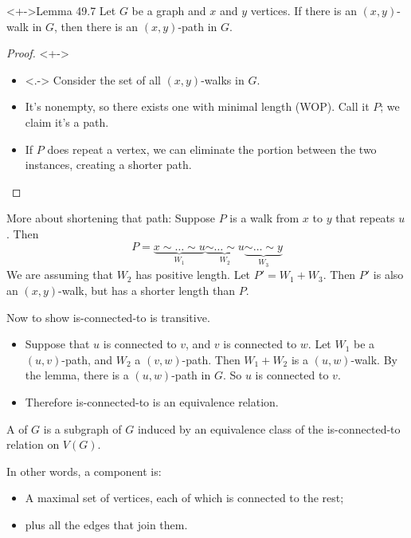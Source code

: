 \documentclass
[ignorenonframetext,14pt,aspectratio=169]
{ngelessonslides}
\begin{document}
\begin{frame}[label=lemma]
\begin{block}<+->{Lemma 49.7}
Let $G$ be a graph and $x$ and $y$ vertices.
If there is an $(x,y)$-walk in $G$, then there is an $(x,y)$-path in $G$.
\end{block}
\begin{proof}<+->
\begin{itemize}
\item<.-> Consider the set of all $(x,y)$-walks in $G$.
\item<+-> It's nonempty, so there exists one with minimal length (WOP).  Call it $P$; we claim it's a path.
\item<+-> If $P$ does repeat a vertex, we can eliminate the portion between the two instances, creating a shorter path. \raa \qedhere
\end{itemize}
\end{proof}
\end{frame}

\begin{frame}[label=lemma-2]
More about shortening that path:  Suppose $P$ is a walk from $x$ to $y$ that repeats $u$.  Then
\[
    P = \underbrace{x \sim \dots \sim u}_{W_1}%
    \underbrace{\sim \dots \sim u}_{W_2}%
    \underbrace{\sim \dots \sim y}_{W_3}
\]
We are assuming that $W_2$ has positive length.
Let $P' = W_1 + W_3$.  Then $P'$ is also an $(x,y)$-walk, but has a shorter length than $P$.
\end{frame}

\begin{frame}[label=ctd-thm-proof-2]
Now to show is-connected-to is transitive.
\begin{itemize}
\item Suppose that $u$ is connected to $v$, and $v$ is connected to $w$.
    Let $W_1$ be a $(u,v)$-path, and $W_2$ a $(v,w)$-path.
    Then $W_1+W_2$ is a $(u,w)$-walk.
    By the lemma, there is a $(u,w)$-path in $G$.
    So $u$ is connected to $v$.
\item Therefore is-connected-to is an equivalence relation.
\end{itemize}
\end{frame}

\begin{frame}[label=cpt-def]
\begin{definition}
    A  of $G$ is a subgraph of $G$ induced by an equivalence class of
    the is-connected-to relation on $V(G)$.
\end{definition}
In other words, a component is:
\begin{itemize}
\item A maximal set of vertices, each of which is connected to the rest;
\item plus all the edges that join them.
\end{itemize}
\end{frame}
\end{document}
